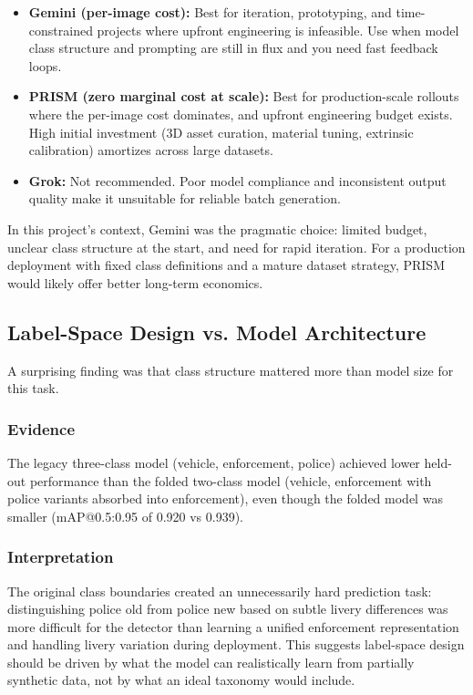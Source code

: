 \documentclass[12pt,a4paper]{article}
\begin{document}
\begin{itemize}
	\item \textbf{Gemini (per-image cost):} Best for iteration, prototyping, and time-constrained projects where upfront engineering is infeasible. Use when model class structure and prompting are still in flux and you need fast feedback loops.
	\item \textbf{PRISM (zero marginal cost at scale):} Best for production-scale rollouts where the per-image cost dominates, and upfront engineering budget exists. High initial investment (3D asset curation, material tuning, extrinsic calibration) amortizes across large datasets.
	\item \textbf{Grok:} Not recommended. Poor model compliance and inconsistent output quality make it unsuitable for reliable batch generation.
\end{itemize}

In this project's context, Gemini was the pragmatic choice: limited budget, unclear class structure at the start, and need for rapid iteration. For a production deployment with fixed class definitions and a mature dataset strategy, PRISM would likely offer better long-term economics.

\subsection{Label-Space Design vs. Model Architecture}

A surprising finding was that class structure mattered more than model size for this task.

\subsubsection{Evidence}

The legacy three-class model (vehicle, enforcement, police) achieved lower held-out performance than the folded two-class model (vehicle, enforcement with police variants absorbed into enforcement), even though the folded model was smaller (mAP@0.5:0.95 of 0.920 vs 0.939).

\subsubsection{Interpretation}

The original class boundaries created an unnecessarily hard prediction task: distinguishing police old from police new based on subtle livery differences was more difficult for the detector than learning a unified enforcement representation and handling livery variation during deployment. This suggests label-space design should be driven by what the model can realistically learn from partially synthetic data, not by what an ideal taxonomy would include.
\end{document}
